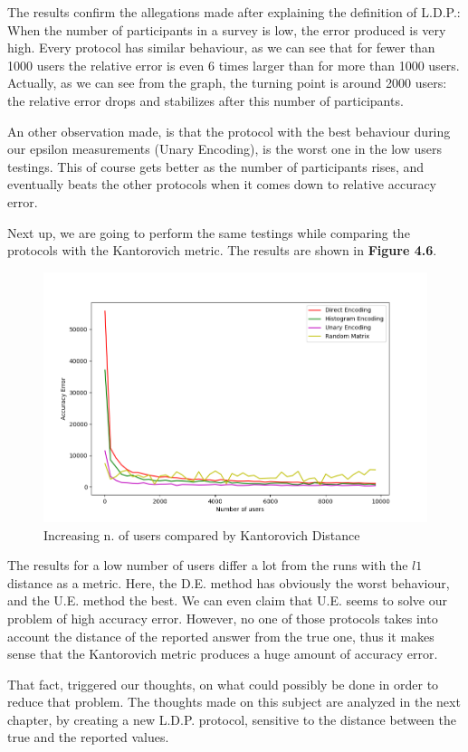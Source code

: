 The results confirm the allegations made after explaining the definition of L.D.P.: When the number of participants in a survey is low, the error produced is very high. Every protocol has similar behaviour, as we can see that for fewer than 1000 users the relative error is even 6 times larger than for more than 1000 users. Actually, as we can see from the graph, the turning point is around 2000 users: the relative error drops and stabilizes after this number of participants. 

An other observation made, is that the protocol with the best behaviour during our epsilon measurements (Unary Encoding), is the worst one in the low users testings. This of course gets better as the number of participants rises, and eventually beats the other protocols when it comes down to relative accuracy error. 

Next up, we are going to perform the same testings while comparing the protocols with the Kantorovich metric. The results are shown in \textbf{Figure 4.6}.

\begin{figure}[!htb]\centering
    \includegraphics[width=1\textwidth]{images/nusers_others_kant.png}
    \caption{Increasing n. of users compared by Kantorovich Distance}
\end{figure}

The results for a low number of users differ a lot from the runs with the $l1$ distance as a metric. Here, the D.E. method has obviously the worst behaviour, and the U.E. method the best. We can even claim that U.E. seems to solve our problem of high accuracy error. However, no one of those protocols takes into account the distance of the reported answer from the true one, thus it makes sense that the Kantorovich metric produces a huge amount of accuracy error.

That fact, triggered our thoughts, on what could possibly be done in order to reduce that problem. The thoughts made on this subject are analyzed in the next chapter, by creating a new L.D.P. protocol, sensitive to the distance between the true and the reported values.